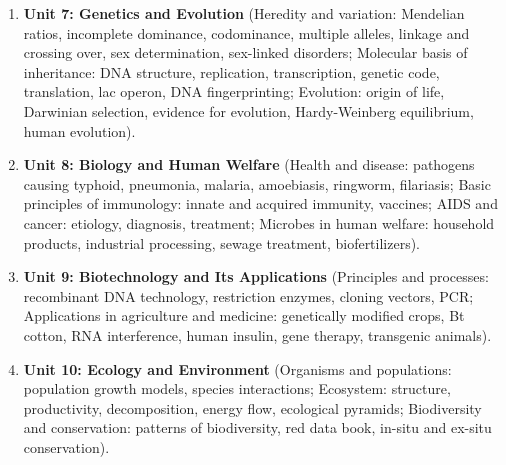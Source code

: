 \documentclass[10pt,twoside,openright]{book}
\begin{document}
\begin{enumerate}[leftmargin=*]
  \item \textbf{Unit 7: Genetics and Evolution} (Heredity and variation: Mendelian ratios, incomplete dominance, codominance, multiple alleles, linkage and crossing over, sex determination, sex-linked disorders; Molecular basis of inheritance: DNA structure, replication, transcription, genetic code, translation, lac operon, DNA fingerprinting; Evolution: origin of life, Darwinian selection, evidence for evolution, Hardy-Weinberg equilibrium, human evolution).
  \item \textbf{Unit 8: Biology and Human Welfare} (Health and disease: pathogens causing typhoid, pneumonia, malaria, amoebiasis, ringworm, filariasis; Basic principles of immunology: innate and acquired immunity, vaccines; AIDS and cancer: etiology, diagnosis, treatment; Microbes in human welfare: household products, industrial processing, sewage treatment, biofertilizers).
  \item \textbf{Unit 9: Biotechnology and Its Applications} (Principles and processes: recombinant DNA technology, restriction enzymes, cloning vectors, PCR; Applications in agriculture and medicine: genetically modified crops, Bt cotton, RNA interference, human insulin, gene therapy, transgenic animals).
  \item \textbf{Unit 10: Ecology and Environment} (Organisms and populations: population growth models, species interactions; Ecosystem: structure, productivity, decomposition, energy flow, ecological pyramids; Biodiversity and conservation: patterns of biodiversity, red data book, in-situ and ex-situ conservation).
\end{enumerate}
\end{document}
